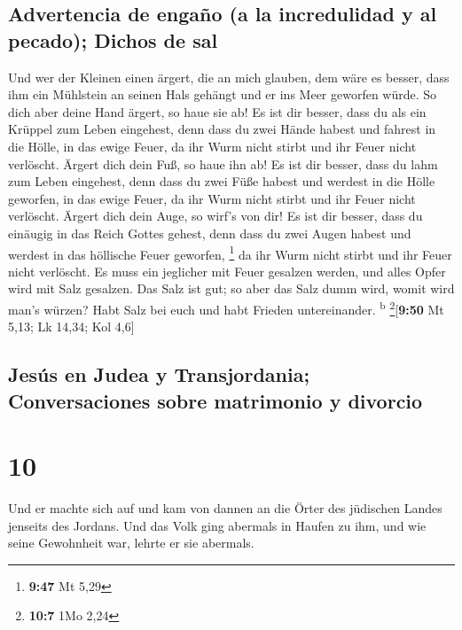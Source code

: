\hypertarget{advertencia-de-engauxf1o-a-la-incredulidad-y-al-pecado-dichos-de-sal}{%
\subsection{Advertencia de engaño (a la incredulidad y al pecado);
Dichos de
sal}\label{advertencia-de-engauxf1o-a-la-incredulidad-y-al-pecado-dichos-de-sal}}

 Und wer der Kleinen einen ärgert, die an mich glauben,
dem wäre es besser, dass ihm ein Mühlstein an seinen Hals gehängt und er
ins Meer geworfen würde.  So dich aber deine Hand ärgert,
so haue sie ab! Es ist dir besser, dass du als ein Krüppel zum Leben
eingehest, denn dass du zwei Hände habest und fahrest in die Hölle, in
das ewige Feuer,  da ihr Wurm nicht stirbt und ihr Feuer
nicht verlöscht.  Ärgert dich dein Fuß, so haue ihn ab!
Es ist dir besser, dass du lahm zum Leben eingehest, denn dass du zwei
Füße habest und werdest in die Hölle geworfen, in das ewige Feuer,
 da ihr Wurm nicht stirbt und ihr Feuer nicht verlöscht.
 Ärgert dich dein Auge, so wirf's von dir! Es ist dir
besser, dass du einäugig in das Reich Gottes gehest, denn dass du zwei
Augen habest und werdest in das höllische Feuer geworfen, \footnote{\textbf{9:47}
  Mt 5,29}  da ihr Wurm nicht stirbt und ihr Feuer nicht
verlöscht.  Es muss ein jeglicher mit Feuer gesalzen
werden, und alles Opfer wird mit Salz gesalzen.  Das Salz
ist gut; so aber das Salz dumm wird, womit wird man's würzen? Habt Salz
bei euch und habt Frieden untereinander. \textsuperscript{b}
\footnote{\textbf{10:7} 1Mo 2,24}{[}\textbf{9:50} Mt 5,13; Lk 14,34; Kol
4,6{]}

\hypertarget{jesuxfas-en-judea-y-transjordania-conversaciones-sobre-matrimonio-y-divorcio}{%
\subsection{Jesús en Judea y Transjordania; Conversaciones sobre
matrimonio y
divorcio}\label{jesuxfas-en-judea-y-transjordania-conversaciones-sobre-matrimonio-y-divorcio}}

\hypertarget{section-9}{%
\section{10}\label{section-9}}

 Und er machte sich auf und kam von dannen an die Örter
des jüdischen Landes jenseits des Jordans. Und das Volk ging abermals in
Haufen zu ihm, und wie seine Gewohnheit war, lehrte er sie abermals.

